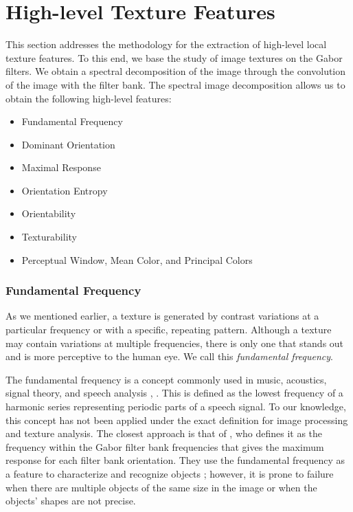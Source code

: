 \documentclass[journal]{IEEEtran}
\begin{document}
\section{High-level Texture Features}\label{sec:high_level_features}
This section addresses the methodology for the extraction of high-level local texture features. To this end, we base the study of image textures on the Gabor filters. We obtain a spectral decomposition of the image through the convolution of the image with the filter bank. The spectral image decomposition allows us to obtain the following high-level features:

\begin{itemize}
	\item Fundamental Frequency
	\item Dominant Orientation
	\item Maximal Response
	\item Orientation Entropy
	\item Orientability
	\item Texturability 
	\item Perceptual Window, Mean Color, and Principal Colors
\end{itemize}

\subsubsection{Fundamental Frequency}
As we mentioned earlier, a texture is generated by contrast variations at a particular frequency or with a specific, repeating pattern. Although a texture may contain variations at multiple frequencies, there is only one that stands out and is more perceptive to the human eye. We call this \textit{fundamental frequency}.

The fundamental frequency is a concept commonly used in music, acoustics, signal theory, and speech analysis \cite{Benward:BOOK:2014}, \cite{Sigmund:ITC:2013}. This is defined as the lowest frequency of a harmonic series representing periodic parts of a speech signal. To our knowledge, this concept has not been applied under the exact definition for image processing and texture analysis. The closest approach is that of \cite{Kamarainen.Kyrki.ea:ICPR:2002}, who defines it as the frequency within the Gabor filter bank frequencies that gives the maximum response for each filter bank orientation. They use the fundamental frequency as a feature to characterize and recognize objects \cite{Kamarainen.Kyrki.ea:DSP:2002}; however, it is prone to failure when there are multiple objects of the same size in the image or when the objects' shapes are not precise.
\end{document}
